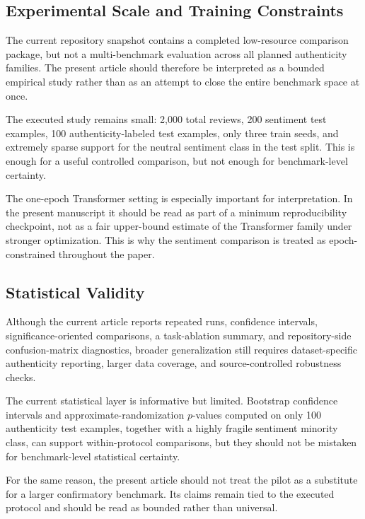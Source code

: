 \documentclass[12pt,a4paper]{article}
\begin{document}
\subsection{Experimental Scale and Training Constraints}

The current repository snapshot contains a completed low-resource comparison package, but not a multi-benchmark evaluation across all planned authenticity families. The present article should therefore be interpreted as a bounded empirical study rather than as an attempt to close the entire benchmark space at once.

The executed study remains small: 2{,}000 total reviews, 200 sentiment test examples, 100 authenticity-labeled test examples, only three train seeds, and extremely sparse support for the neutral sentiment class in the test split. This is enough for a useful controlled comparison, but not enough for benchmark-level certainty.

The one-epoch Transformer setting is especially important for interpretation. In the present manuscript it should be read as part of a minimum reproducibility checkpoint, not as a fair upper-bound estimate of the Transformer family under stronger optimization. This is why the sentiment comparison is treated as epoch-constrained throughout the paper.

\subsection{Statistical Validity}

Although the current article reports repeated runs, confidence intervals, significance-oriented comparisons, a task-ablation summary, and repository-side confusion-matrix diagnostics, broader generalization still requires dataset-specific authenticity reporting, larger data coverage, and source-controlled robustness checks.

The current statistical layer is informative but limited. Bootstrap confidence intervals and approximate-randomization $p$-values computed on only 100 authenticity test examples, together with a highly fragile sentiment minority class, can support within-protocol comparisons, but they should not be mistaken for benchmark-level statistical certainty.

For the same reason, the present article should not treat the pilot as a substitute for a larger confirmatory benchmark. Its claims remain tied to the executed protocol and should be read as bounded rather than universal.
\end{document}
